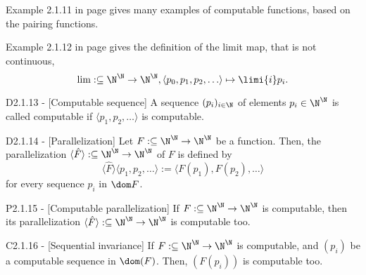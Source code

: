 \documentclass[12pt]{article}
\begin{document}
Example 2.1.11 in page  gives many examples of computable functions, based on the pairing functions.

Example 2.1.12 in page  gives the definition of the limit map, that is not continuous,
\[
    \lim : \subseteq \N^\N \to \N^\N, \langle p_0,p_1,p_2,\ldots \rangle \mapsto \limi{i} p_i.
\]

\begin{flexidefinition}{D2.1.13 - }[Computable sequence]
    A sequence $(p_i)_{i \in \N}$ of elements $p_i \in \N^\N$ is called computable if $\langle p_1,p_2,\ldots \rangle$ is computable.
\end{flexidefinition}

\begin{flexidefinition}{D2.1.14 - }[Parallelization]
    Let $F : \subseteq \N^\N \to \N^\N$ be a function. Then, the parallelization $\langle \hat F \rangle : \subseteq \N^\N \to \N^\N$ of $F$ is defined by 
    \[
        \langle \hat F \rangle \langle p_1,p_2,\ldots \rangle := \langle F(p_1),F(p_2),\ldots \rangle
    \]
    for every sequence $p_i$ in $\dom F$.
\end{flexidefinition}

\begin{flexilemma}{P2.1.15 - }[Computable parallelization]
    If $F : \subseteq \N^\N \to \N^\N$ is computable, then its parallelization $\langle \hat F \rangle : \subseteq \N^\N \to \N^\N$ is computable too.
\end{flexilemma}
\begin{flexilemma}{C2.1.16 - }[Sequential invariance]
    If $F : \subseteq \N^\N \to \N^\N$ is computable, and $(p_i)$ be a computable sequence in $\dom(F)$. Then, $(F(p_i))$ is computable too.
\end{flexilemma}

{}

\end{document}
